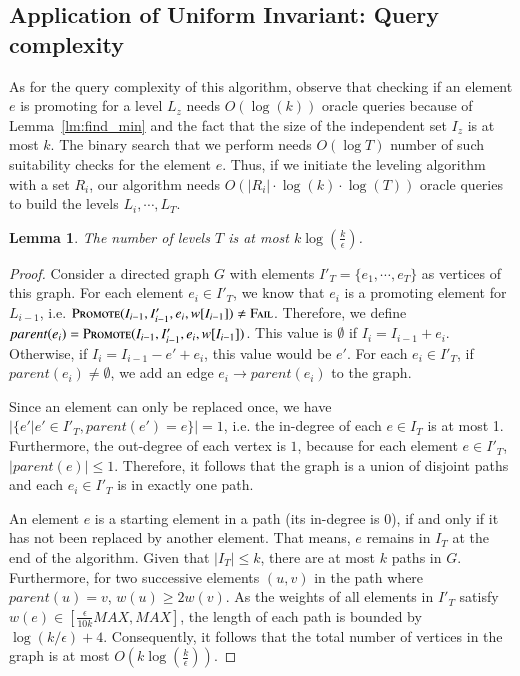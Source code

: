 \documentclass[11pt]{article}
\newtheorem{lemma}[theorem]{Lemma}
\newcommand{\mO}{O}
\newcommand{\err}{{\textsc{Fail}}}
\newcommand{\replacementTester}{\textsc{Promote}}
\begin{document}
\subsection{Application of Uniform Invariant: Query complexity}
As for the query complexity of this algorithm, 
observe that checking if an element $e$ is promoting  for a level $L_{z}$ 
needs $O(\log(k))$ oracle queries 
because of Lemma~\ref{lm:find_min} and the fact that the size of the independent set $I_z$ is at most $k$.
The binary search that we perform needs $O(\log T)$ number of such suitability checks for the element $e$. 
Thus, if we initiate the leveling algorithm with a set $R_i$, 
our algorithm needs $O(|R_i|\cdot \log(k) \cdot \log(T))$ oracle queries to build the levels $L_i,\cdots, L_T$. 

\begin{lemma}
\label{lm:number_of_levels}
  The number of levels $T$ is at most $k\log(\frac{k}{\epsilon})$.
\end{lemma}
\begin{proof}
  Consider a directed graph $G$ with elements $I'_T = \{e_1,\cdots,e_T\}$ as vertices of this graph.
  For each element $e_i \in I'_T$, we know that $e_i$ is a promoting element for $L_{i-1}$, i.e. $\replacementTester(I_{i-1}, I'_{i-1}, e_i, w[I_{i-1}]) \neq \err$. Therefore, we define $parent(e_i) = \replacementTester(I_{i-1}, I'_{i-1}, e_i, w[I_{i-1}])$. This value is $\emptyset$ if $I_i = I_{i-1} + e_i$. Otherwise, if $I_i = I_{i-1} - e' + e_i$, this value would be $e'$.
  For each $e_i \in I'_T$, if $parent(e_i) \neq \emptyset$, we add an edge $e_i \to parent(e_i)$ to the graph.

  Since an element can only be replaced once, we have  $|\{e'|e' \in I'_T, parent(e') = e\}| = 1$, i.e. the in-degree of each $e \in I_T$ is at most 1.
  Furthermore, the out-degree of each vertex is $1$, because for each element $e\in I'_T$, $|parent(e)| \le 1$.
  Therefore, it follows that the graph is a union of disjoint paths and each $e_i \in I'_T$ is
  in exactly one path.

   An element $e$ is a starting element in a path (its in-degree is $0$), if and only if it has not been replaced by another element. That means, $e$ remains in $I_T$ at the end of the algorithm. Given that $|I_T| \le k$, there are at most $k$ paths in $G$.
  Furthermore, for two successive elements $(u, v)$ in the path where $parent(u) = v$, $w(u) \ge 2w(v)$.
  As the weights of all elements in $I'_T$ satisfy $w(e) \in [\frac{\epsilon}{10k}MAX, MAX]$,
  the length of each path is bounded by $\log(k/\epsilon) + 4$. 
  Consequently, it follows that the total number of vertices in the graph is at most $\mO(k\log(\frac{k}{\epsilon}))$.
\end{proof}
\end{document}
